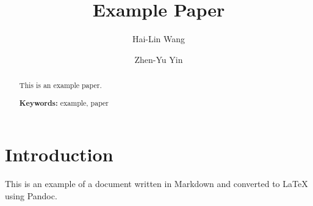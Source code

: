 \documentclass[
    Journal,
    letterpaper
]{ascelike-new}
\begin{document}
\title{Example Paper}

\author[1]{Hai-Lin Wang}
\author[1,*]{Zhen-Yu Yin}


\maketitle

\begin{abstract}
This is an example paper.

\noindent
\textbf{Keywords:}  example,  paper

\end{abstract}

\hypertarget{introduction}{%
\section{Introduction}\label{introduction}}

This is an example of a document written in Markdown and converted to
LaTeX using Pandoc.

%
%
\label{section:references}


\listoftables
\listoffigures
\end{document}
